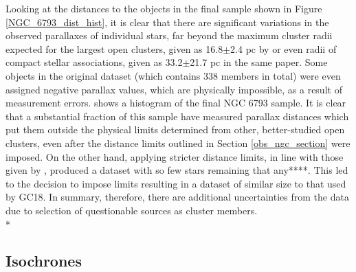 \documentclass[12pt, a4paper]{report}
\begin{document}
Looking at the distances to the objects in the final sample shown in Figure \ref{NGC_6793_dist_hist}, it is clear that there are significant variations in the observed parallaxes of individual stars, far beyond the maximum cluster radii expected for the largest open clusters, given as 16.8$\pm$2.4 pc by \cite{2006A&A...456..523S} or even radii of compact stellar associations, given as 33.2$\pm$21.7 pc in the same paper. Some objects in the original dataset (which contains 338 members in total) were even assigned negative parallax values, which are physically impossible, as a result of measurement errors.  shows a histogram of the final NGC 6793 sample. It is clear that a substantial fraction of this sample have measured parallax distances which put them outside the physical limits determined from other, better-studied open clusters, even after the distance limits outlined in Section \ref{obs_ngc_section} were imposed. On the other hand, applying stricter distance limits, in line with those given by \cite{2006A&A...456..523S}, produced a dataset with so few stars remaining that any****. This led to the decision to impose limits resulting in a dataset of similar size to that used by GC18. In summary, therefore, there are additional uncertainties from the data due to selection of questionable sources as cluster members. \\*

\subsection{Isochrones}
\end{document}
